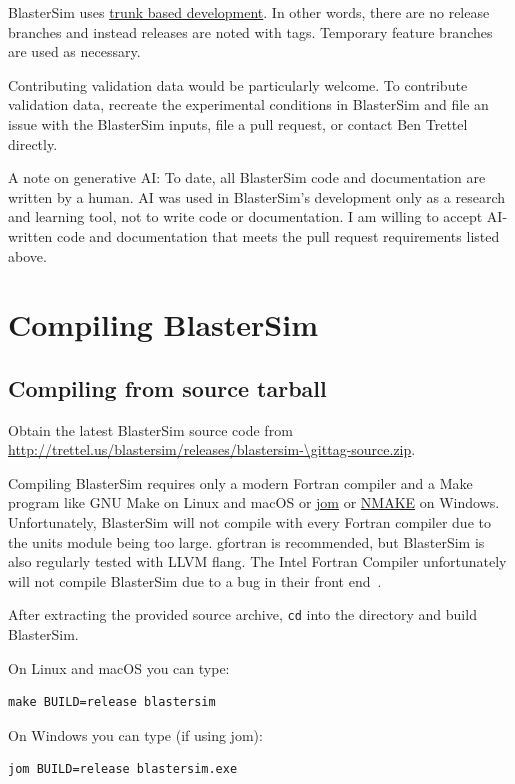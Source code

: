 BlasterSim uses \href{https://trunkbaseddevelopment.com/}{trunk based development}.
In other words, there are no release branches and instead releases are noted with tags.
Temporary feature branches are used as necessary.

Contributing validation data would be particularly welcome.
To contribute validation data, recreate the experimental conditions in BlasterSim and file an issue with the BlasterSim inputs, file a pull request, or contact Ben Trettel directly.

A note on generative AI\@:
To date, all BlasterSim code and documentation are written by a human.
AI was used in BlasterSim's development only as a research and learning tool, not to write code or documentation.
I am willing to accept AI-written code and documentation that meets the pull request requirements listed above.

\section{Compiling BlasterSim}\label{compiling}

\subsection{Compiling from source tarball}\label{compiling-from-source-tarball}

Obtain the latest BlasterSim source code from \url{http://trettel.us/blastersim/releases/blastersim-\gittag-source.zip}.

Compiling BlasterSim requires only a modern Fortran compiler and a Make program like GNU Make on Linux and macOS or \href{https://wiki.qt.io/Jom}{jom} or \href{https://learn.microsoft.com/en-us/cpp/build/reference/nmake-reference?view=msvc-170}{NMAKE} on Windows.
Unfortunately, BlasterSim will not compile with every Fortran compiler due to the units module being too large.
gfortran is recommended, but BlasterSim is also regularly tested with LLVM flang.
The Intel Fortran Compiler unfortunately will not compile BlasterSim due to a bug in their front end~\cite{green_re_2024}.

After extracting the provided source archive, \texttt{cd} into the directory and build BlasterSim.

On Linux and macOS you can type:
\begin{lstlisting}
make BUILD=release blastersim
\end{lstlisting}

On Windows you can type (if using jom):
\begin{lstlisting}
jom BUILD=release blastersim.exe
\end{lstlisting}

